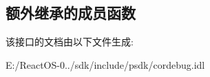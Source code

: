 \subsection*{额外继承的成员函数}


该接口的文档由以下文件生成\+:\begin{DoxyCompactItemize}
\item 
E\+:/\+React\+O\+S-\/0../sdk/include/psdk/cordebug.\+idl\end{DoxyCompactItemize}
